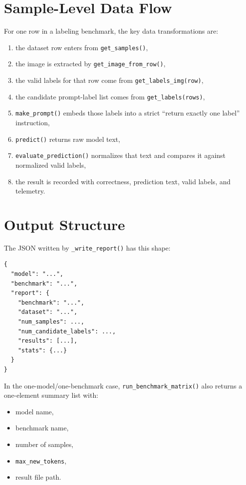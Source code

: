 \documentclass[11pt]{article}
\begin{document}
\section{Sample-Level Data Flow}
For one row in a labeling benchmark, the key data transformations are:
\begin{enumerate}[label=\arabic*.]
    \item the dataset row enters from \texttt{get\_samples()},
    \item the image is extracted by \texttt{get\_image\_from\_row()},
    \item the valid labels for that row come from \texttt{get\_labels\_img(row)},
    \item the candidate prompt-label list comes from \texttt{get\_labels(rows)},
    \item \texttt{make\_prompt()} embeds those labels into a strict ``return exactly one label'' instruction,
    \item \texttt{predict()} returns raw model text,
    \item \texttt{evaluate\_prediction()} normalizes that text and compares it against normalized valid labels,
    \item the result is recorded with correctness, prediction text, valid labels, and telemetry.
\end{enumerate}

\section{Output Structure}
The JSON written by \texttt{\_write\_report()} has this shape:
\begin{verbatim}
{
  "model": "...",
  "benchmark": "...",
  "report": {
    "benchmark": "...",
    "dataset": "...",
    "num_samples": ...,
    "num_candidate_labels": ...,
    "results": [...],
    "stats": {...}
  }
}
\end{verbatim}

In the one-model/one-benchmark case, \texttt{run\_benchmark\_matrix()} also returns a one-element summary list with:
\begin{itemize}[leftmargin=*]
    \item model name,
    \item benchmark name,
    \item number of samples,
    \item \texttt{max\_new\_tokens},
    \item result file path.
\end{itemize}
\end{document}
